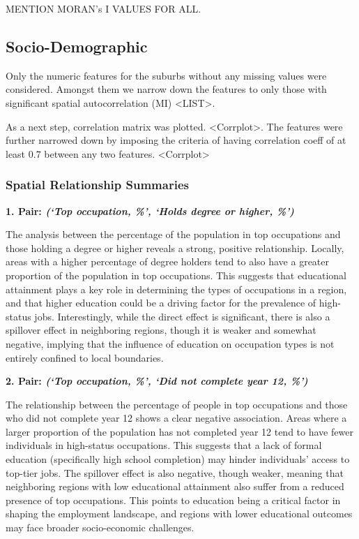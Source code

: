 \documentclass[
	a4paper, %
	10pt, %
	unnumberedsections, %
	twoside, %
]{LTJournalArticle}
\begin{document}
MENTION MORAN's I VALUES FOR ALL.

\subsection{Socio-Demographic}
Only the numeric features for the suburbs without any missing values were considered. Amongst them we narrow down the features to only those with significant spatial autocorrelation (MI) <LIST>. 

As a next step, correlation matrix was plotted. <Corrplot>. The features were further narrowed down by imposing the criteria of having correlation coeff of at least $0.7$ between any two features. <Corrplot>



\subsubsection{Spatial Relationship Summaries}

\textbf{1. Pair: \textit{(‘Top occupation, \%’, ‘Holds degree or higher, \%’)}} 

The analysis between the percentage of the population in top occupations and those holding a degree or higher reveals a strong, positive relationship. Locally, areas with a higher percentage of degree holders tend to also have a greater proportion of the population in top occupations. This suggests that educational attainment plays a key role in determining the types of occupations in a region, and that higher education could be a driving factor for the prevalence of high-status jobs. Interestingly, while the direct effect is significant, there is also a spillover effect in neighboring regions, though it is weaker and somewhat negative, implying that the influence of education on occupation types is not entirely confined to local boundaries.

\textbf{2. Pair: \textit{(‘Top occupation, \%’, ‘Did not complete year 12, \%’)}} 

The relationship between the percentage of people in top occupations and those who did not complete year 12 shows a clear negative association. Areas where a larger proportion of the population has not completed year 12 tend to have fewer individuals in high-status occupations. This suggests that a lack of formal education (specifically high school completion) may hinder individuals’ access to top-tier jobs. The spillover effect is also negative, though weaker, meaning that neighboring regions with low educational attainment also suffer from a reduced presence of top occupations. This points to education being a critical factor in shaping the employment landscape, and regions with lower educational outcomes may face broader socio-economic challenges.
\end{document}
